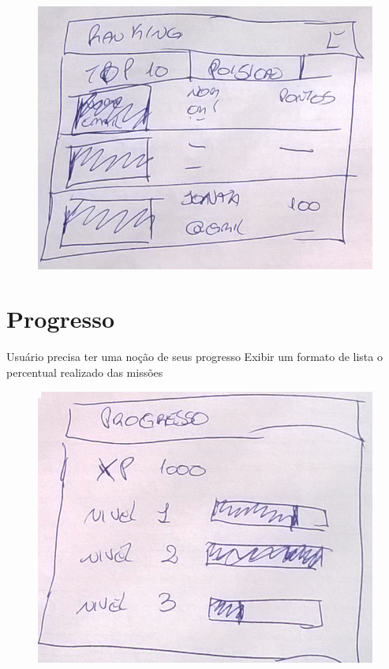 \documentclass[
	12pt,				%
	oneside,			%
	a4paper,			%
	english,			%
	french,				%
	spanish,			%
	brazil,				%
	]{abntex2}
\begin{document}
\begin{figure}[ht]
\centering
\includegraphics[width=1\textwidth]{imagens/proposta_ranking.png}
\end{figure}

\section{Progresso}

Usuário precisa ter uma noção de seus progresso
Exibir um formato de lista o percentual realizado das missões 

\begin{figure}[ht]
\centering
\includegraphics[width=1\textwidth]{imagens/proposta_progresso.png}
\end{figure}
\end{document}
